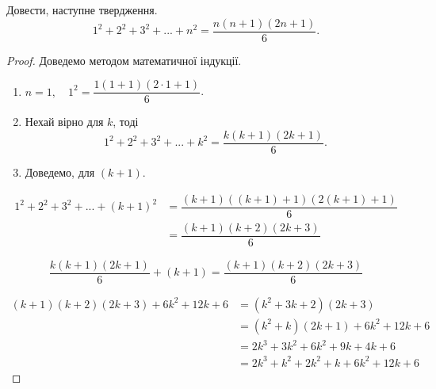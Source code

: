 \begin{example}
    Довести, наступне твердження.
    \begin{equation*}
        1^2 + 2^2 + 3^2 + ... + n^2 = \dfrac{n(n+1)(2n+1)}{6}.
    \end{equation*}
    \begin{proof}
        Доведемо методом математичної індукції.
    
        \begin{enumerate}
            \item $n = 1, \quad 1^2 = \dfrac{1(1 + 1)(2 \cdot 1 + 1)}{6}$.
            \item Нехай вірно для $k$, тоді
            \begin{equation*}
                1^2 + 2^2 + 3^2 + ... + k^2 = \dfrac{k(k+1)(2k+1)}{6}.
            \end{equation*}
            \item Доведемо, для $(k+1)$.
        \end{enumerate}

        \begin{equation*}
            \begin{split}
                1^2 + 2^2 + 3^2 + ... + (k+1)^2
                &= \dfrac{(k+1)((k+1)+1)(2(k+1)+1)}{6}\\
                &= \dfrac{(k+1)(k+2)(2k+3)}{6}
            \end{split}
        \end{equation*}

        \begin{equation*}
            \dfrac{k(k+1)(2k+1)}{6} + (k+1)
            = \dfrac{(k+1)(k+2)(2k+3)}{6}
        \end{equation*}

        \begin{equation*}
            \begin{split}
                (k + 1)(k + 2)(2k + 3) + 6k^2 + 12k + 6
                &= (k^2 + 3k + 2)(2k + 3) \\
                &= (k^2 + k)(2k + 1) + 6k^2 + 12k + 6 \\
                &= 2k^3 + 3k^2 + 6k^2 + 9k + 4k + 6 \\
                &= 2k^3 + k^2 + 2k^2 + k + 6k^2 + 12k + 6
            \end{split}
        \end{equation*}
    \end{proof}
\end{example}

